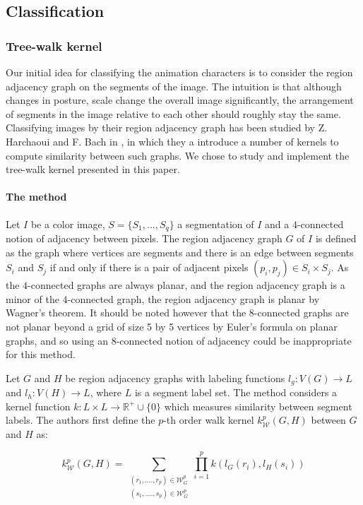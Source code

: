 \subsection{Classification}
\subsubsection{Tree-walk kernel}
Our initial idea for classifying the animation characters is to consider the region adjacency graph on the segments of the image. The intuition is that although changes in posture, scale change the overall image significantly, the arrangement of segments in the image relative to each other should roughly stay the same. Classifying images by their region adjacency graph has been studied by Z. Harchaoui and F. Bach in \cite{harchaoui2007image}, in which they a introduce a number of kernels to compute similarity between such graphs. We chose to study and implement the tree-walk kernel presented in this paper.

\paragraph{The method} Let $I$ be a color image, $S = \{S_1, ..., S_q\}$ a segmentation of $I$ and a $4$-connected notion of adjacency between pixels. The region adjacency graph $G$ of $I$ is defined as the graph where vertices are segments and there is an edge between segments $S_i$ and $S_j$ if and only if there is a pair of adjacent pixels $(p_i, p_j) \in S_i \times S_j$. As the $4$-connected graphs are always planar, and the region adjacency graph is a minor of the $4$-connected graph, the region adjacency graph is planar by Wagner's theorem. It should be noted however that the $8$-connected graphs are not planar beyond a grid of size 5 by 5 vertices by Euler's formula on planar graphs, and so using an $8$-connected notion of adjacency could be inappropriate for this method.

Let $G$ and $H$ be region adjacency graphs with labeling functions $l_g : V(G) \rightarrow L$ and $l_h : V(H) \rightarrow L$, where $L$ is a segment label set. The method considers a kernel function $k : L \times L \rightarrow \mathbb{R}^+ \cup \{0\}$ which measures similarity between segment labels. The authors first define the $p$-th order walk kernel $k_{\mathcal{W}}^p(G,H)$ between $G$ and $H$ as:

\[
k_{\mathcal{W}}^p(G,H) = \sum_{\substack{(r_1, ...., r_p) \in \mathcal{W}_G^p\\ (s_1, ...., s_p) \in \mathcal{W}_G^p}} \prod_{i=1}^p k(l_G(r_i), l_H(s_i))
\]

